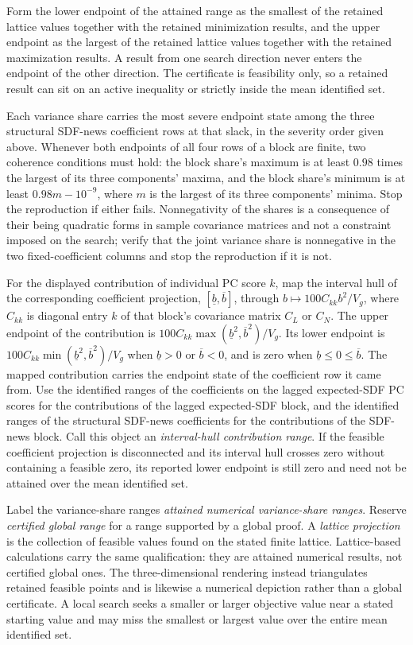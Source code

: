 \documentclass[11pt]{article}
\begin{document}
Form the lower endpoint of the attained range as the smallest of the retained lattice values together
with the retained minimization results, and the upper endpoint as the largest of the retained lattice
values together with the retained maximization results. A result from one search direction never
enters the endpoint of the other direction. The certificate is feasibility only, so a retained result
can sit on an active inequality or strictly inside the mean identified set.

Each variance share carries the most severe endpoint state among the three structural SDF-news
coefficient rows at that slack, in the severity order given above. Whenever both endpoints of all
four rows of a block are finite, two coherence conditions must hold: the block share's maximum is at least \(0.98\) times
the largest of its three components' maxima, and the block share's minimum is at least
\(0.98m-10^{-9}\), where \(m\) is the largest of its three components' minima. Stop the reproduction if either fails.
Nonnegativity of the shares is a consequence of their being quadratic forms in sample covariance
matrices and not a constraint imposed on the search; verify that the joint variance share is
nonnegative in the two fixed-coefficient columns and stop the reproduction if it is not.

For the displayed contribution of individual PC score \(k\), map the interval hull of the
corresponding coefficient projection, \([\underline b,\overline b]\), through
\(b\mapsto100C_{kk}b^2/V_g\), where \(C_{kk}\) is
diagonal entry \(k\) of that block's covariance matrix \(C_L\) or \(C_N\). The upper endpoint of the
contribution is \(100C_{kk}\max(\underline b^2,\overline b^2)/V_g\). Its lower endpoint is
\(100C_{kk}\min(\underline b^2,\overline b^2)/V_g\) when \(\underline b>0\) or \(\overline b<0\), and
is zero when \(\underline b\le0\le\overline b\). The mapped contribution carries the endpoint state of
the coefficient row it came from. Use the identified ranges of the coefficients on the lagged
expected-SDF PC scores for the contributions of the lagged expected-SDF block, and the identified
ranges of the structural SDF-news coefficients for the contributions of the SDF-news block. Call
this object an \emph{interval-hull contribution range}. If the feasible coefficient projection is
disconnected and its interval hull crosses zero without containing a feasible zero, its reported
lower endpoint is still zero and need not be attained over the mean identified set.

Label the variance-share ranges \emph{attained numerical variance-share ranges}. Reserve
\emph{certified global range} for a range supported by a global proof. A \emph{lattice
projection} is the collection of feasible values found on the stated finite lattice. Lattice-based calculations carry the same qualification: they are attained numerical results, not
certified global ones. The three-dimensional rendering instead
triangulates retained feasible points and is likewise a numerical depiction rather than a global
certificate.
A local search seeks a smaller or larger objective value near a stated starting value and may miss
the smallest or largest value over the entire mean identified set.
\end{document}
